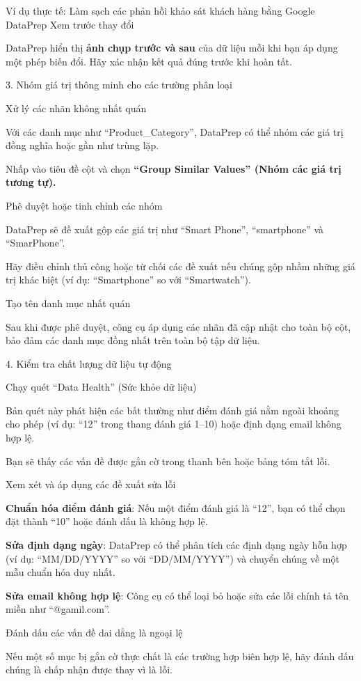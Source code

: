 \begin{examplebox}{Ví dụ thực tế: Làm sạch các phản hồi khảo sát khách hàng bằng Google DataPrep}
Xem trước thay đổi

DataPrep hiển thị \textbf{ảnh chụp trước và sau} của dữ liệu mỗi khi bạn áp dụng một phép biến đổi. Hãy xác nhận kết quả đúng trước khi hoàn tất.

3. Nhóm giá trị thông minh cho các trường phân loại

Xử lý các nhãn không nhất quán

Với các danh mục như ``Product\_Category'', DataPrep có thể nhóm các giá trị đồng nghĩa hoặc gần như trùng lặp.

Nhấp vào tiêu đề cột và chọn \textbf{``Group Similar Values'' (Nhóm các giá trị tương tự).}

Phê duyệt hoặc tinh chỉnh các nhóm

DataPrep sẽ đề xuất gộp các giá trị như ``Smart Phone'', ``smartphone'' và ``SmarPhone''.

Hãy điều chỉnh thủ công hoặc từ chối các đề xuất nếu chúng gộp nhầm những giá trị khác biệt (ví dụ: ``Smartphone'' so với ``Smartwatch'').

Tạo tên danh mục nhất quán

Sau khi được phê duyệt, công cụ áp dụng các nhãn đã cập nhật cho toàn bộ cột, bảo đảm các danh mục đồng nhất trên toàn bộ tập dữ liệu.

4. Kiểm tra chất lượng dữ liệu tự động

Chạy quét ``Data Health'' (Sức khỏe dữ liệu)

Bản quét này phát hiện các bất thường như điểm đánh giá nằm ngoài khoảng cho phép (ví dụ: ``12'' trong thang đánh giá 1--10) hoặc định dạng email không hợp lệ.

Bạn sẽ thấy các vấn đề được gắn cờ trong thanh bên hoặc bảng tóm tắt lỗi.

Xem xét và áp dụng các đề xuất sửa lỗi

\textbf{Chuẩn hóa điểm đánh giá}: Nếu một điểm đánh giá là ``12'', bạn có thể chọn đặt thành ``10'' hoặc đánh dấu là không hợp lệ.

\textbf{Sửa định dạng ngày}: DataPrep có thể phân tích các định dạng ngày hỗn hợp (ví dụ: ``MM/DD/YYYY'' so với ``DD/MM/YYYY'') và chuyển chúng về một mẫu chuẩn hóa duy nhất.

\textbf{Sửa email không hợp lệ}: Công cụ có thể loại bỏ hoặc sửa các lỗi chính tả tên miền như ``@gamil.com''.

Đánh dấu các vấn đề dai dẳng là ngoại lệ

Nếu một số mục bị gắn cờ thực chất là các trường hợp biên hợp lệ, hãy đánh dấu chúng là chấp nhận được thay vì là lỗi.


\end{examplebox}
